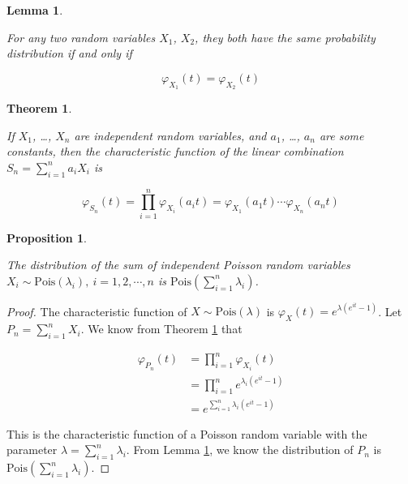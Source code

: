 \documentclass[
  12pt,
]{krantz}
\newtheorem{theorem}{Theorem}[chapter]
\newtheorem{lemma}{Lemma}[chapter]
\newtheorem{proposition}{Proposition}[chapter]
\theoremstyle{definition}
\theoremstyle{definition}
\theoremstyle{definition}
\theoremstyle{definition}
\theoremstyle{remark}
\begin{document}
\begin{lemma}
\protect\hypertarget{lem:chf-pdf}{}\label{lem:chf-pdf}

For any two random variables \(X_1\), \(X_2\), they both have the same probability distribution if and only if

\[\varphi _{X_1}(t)=\varphi _{X_2}(t)\]

\end{lemma}

\begin{theorem}
\protect\hypertarget{thm:chf-sum}{}\label{thm:chf-sum}

If \(X_1\), \ldots, \(X_n\) are independent random variables, and \(a_1\), \ldots, \(a_n\) are some constants, then the characteristic function of the linear combination \(S_n=\sum_{i=1}^na_iX_i\) is

\[\varphi _{S_{n}}(t)=\prod_{i=1}^n\varphi _{X_i}(a_{i}t)=\varphi _{X_{1}}(a_{1}t)\cdots \varphi _{X_{n}}(a_{n}t)\]

\end{theorem}

\begin{proposition}
\protect\hypertarget{prp:unlabeled-div-3}{}\label{prp:unlabeled-div-3}

The distribution of the sum of independent Poisson random variables \(X_i \sim \mathrm{Pois}(\lambda_i),\: i=1,2,\cdots,n\) is \(\mathrm{Pois}(\sum_{i=1}^n\lambda_i)\).

\end{proposition}

\begin{proof}

The characteristic function of \(X\sim\mathrm{Pois}(\lambda)\) is \(\varphi _{X}(t)=e^{\lambda (e^{it}-1)}\). Let \(P_n=\sum_{i=1}^nX_i\). We know from Theorem \ref{thm:chf-sum} that

\begin{equation*}
\begin{split}
\varphi _{P_{n}}(t) & =\prod_{i=1}^n\varphi _{X_i}(t) \\
& =\prod_{i=1}^n e^{\lambda_i (e^{it}-1)} \\
& = e^{\sum_{i=1}^n \lambda_i (e^{it}-1)}
\end{split}
\end{equation*}

This is the characteristic function of a Poisson random variable with the parameter \(\lambda=\sum_{i=1}^n \lambda_i\). From Lemma \ref{lem:chf-pdf}, we know the distribution of \(P_n\) is \(\mathrm{Pois}(\sum_{i=1}^n\lambda_i)\).

\end{proof}
\end{document}
